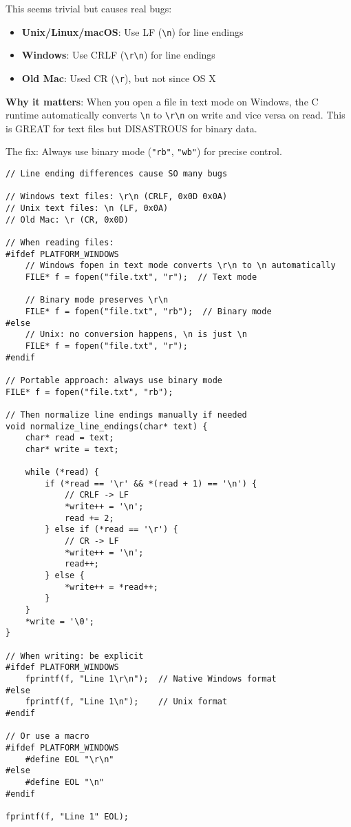 This seems trivial but causes real bugs:

\begin{itemize}
    \item \textbf{Unix/Linux/macOS}: Use LF (\texttt{\textbackslash n}) for line endings
    \item \textbf{Windows}: Use CRLF (\texttt{\textbackslash r\textbackslash n}) for line endings
    \item \textbf{Old Mac}: Used CR (\texttt{\textbackslash r}), but not since OS X
\end{itemize}

\textbf{Why it matters}: When you open a file in text mode on Windows, the C runtime automatically converts \texttt{\textbackslash n} to \texttt{\textbackslash r\textbackslash n} on write and vice versa on read. This is GREAT for text files but DISASTROUS for binary data.

The fix: Always use binary mode (\texttt{"rb"}, \texttt{"wb"}) for precise control.

\begin{lstlisting}
// Line ending differences cause SO many bugs

// Windows text files: \r\n (CRLF, 0x0D 0x0A)
// Unix text files: \n (LF, 0x0A)
// Old Mac: \r (CR, 0x0D)

// When reading files:
#ifdef PLATFORM_WINDOWS
    // Windows fopen in text mode converts \r\n to \n automatically
    FILE* f = fopen("file.txt", "r");  // Text mode

    // Binary mode preserves \r\n
    FILE* f = fopen("file.txt", "rb");  // Binary mode
#else
    // Unix: no conversion happens, \n is just \n
    FILE* f = fopen("file.txt", "r");
#endif

// Portable approach: always use binary mode
FILE* f = fopen("file.txt", "rb");

// Then normalize line endings manually if needed
void normalize_line_endings(char* text) {
    char* read = text;
    char* write = text;

    while (*read) {
        if (*read == '\r' && *(read + 1) == '\n') {
            // CRLF -> LF
            *write++ = '\n';
            read += 2;
        } else if (*read == '\r') {
            // CR -> LF
            *write++ = '\n';
            read++;
        } else {
            *write++ = *read++;
        }
    }
    *write = '\0';
}

// When writing: be explicit
#ifdef PLATFORM_WINDOWS
    fprintf(f, "Line 1\r\n");  // Native Windows format
#else
    fprintf(f, "Line 1\n");    // Unix format
#endif

// Or use a macro
#ifdef PLATFORM_WINDOWS
    #define EOL "\r\n"
#else
    #define EOL "\n"
#endif

fprintf(f, "Line 1" EOL);
\end{lstlisting}

